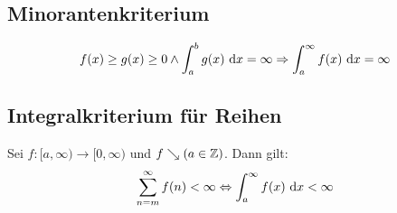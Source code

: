 \subsection{Minorantenkriterium}
\begin{equation*}
    f(x) \geq g(x) \geq 0 \land \int_a^b g(x) \text{ d}x = \infty
    \Rightarrow \int_a^\infty f(x) \text{ d}x = \infty
\end{equation*}

\subsection{Integralkriterium für Reihen}
Sei $f: [a, \infty) \rightarrow [0, \infty)$ und $f \searrow (a \in \mathbb{Z})$. Dann
gilt:
\begin{equation*}
    \sum_{n=m}^\infty f(n) < \infty \Leftrightarrow
    \int_a^\infty f(x) \text{ d}x < \infty
\end{equation*}
